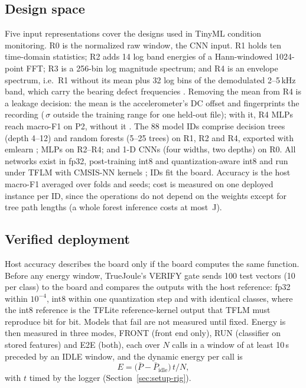 \documentclass[conference]{IEEEtran}
\newcommand{\uJ}{\,\textmu J}
\newcommand{\TJ}{TrueJoule}
\begin{document}
\subsection{Design space}\label{sec:tj-space}
Five input representations cover the designs used in TinyML condition monitoring. R0 is the normalized raw window,
the CNN input. R1 holds ten time-domain statistics; R2 adds 14 log band energies of a Hann-windowed 1024-point FFT; R3
is a 256-bin log magnitude spectrum; and R4 is an envelope spectrum, i.e.\ R1 without its mean plus 32 log bins of the
demodulated 2--5\,kHz band, which carry the bearing defect frequencies \cite{randall2011rolling}. Removing the mean
from R4 is a leakage decision: the mean is the accelerometer's DC offset and fingerprints the recording
(\NumHostMeanZMax{}\,$\sigma$ outside the training range for one held-out file); with it, R4 MLPs reach macro-F1
\NumHostAblMeanWith{} on P2, without it \NumHostAblMeanWithout{}. The 88 model IDs comprise decision trees (depth 4--12)
and random forests (5--25 trees) on R1, R2 and R4, exported with emlearn \cite{nordby2019emlearn}; MLPs on R2--R4; and
1-D CNNs (four widths, two depths) on R0. All networks exist in fp32, post-training int8 and quantization-aware int8
and run under TFLM \cite{david2021tflm} with CMSIS-NN kernels \cite{lai2018cmsisnn}; \NumCwruNModels{} IDs fit the
board. Accuracy is the host macro-F1 averaged over folds and seeds; cost is measured on one deployed instance per ID,
since the operations do not depend on the weights except for tree path lengths (a whole forest inference costs at most
\NumPuRFRunMax\uJ{}).

\subsection{Verified deployment}\label{sec:tj-verify}
Host accuracy describes the board only if the board computes the same function. Before any energy window, \TJ{}'s
VERIFY gate sends 100 test vectors (10 per class) to the board and compares the outputs with the host reference: fp32
within $10^{-4}$, int8 within one quantization step and with identical classes, where the int8 reference is the
TFLite reference-kernel output that TFLM must reproduce bit for bit. Models that fail are not measured until fixed.
Energy is then measured in three modes, FRONT (front end only), RUN (classifier on stored features) and E2E (both),
each over $N$ calls in a window of at least 10\,s preceded by an IDLE window, and the dynamic energy per call is
\begin{equation}
E=\big(\bar P-\bar P_\mathrm{idle}\big)\,t/N ,
\label{eq:energy}
\end{equation}
with $t$ timed by the logger (Section~\ref{sec:setup-rig}).
\end{document}
